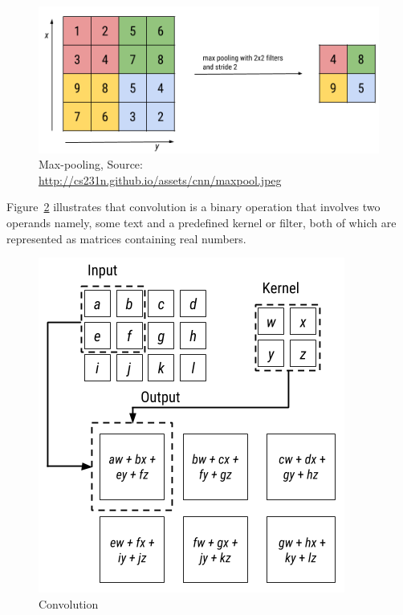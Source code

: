 \begin{figure}[!htb]
    \centering
    \includegraphics[scale=0.65]{Figures/max-pooling.png}
    \caption{Max-pooling, Source: \url{http://cs231n.github.io/assets/cnn/maxpool.jpeg}}
    \label{fig:maxpool}
\end{figure}
Figure~\ref{fig:convolution} illustrates that convolution is a binary operation that involves two operands namely, some text and a predefined kernel or filter, both of which are represented as matrices containing real numbers.
\begin{figure}[!htb]
    \centering
    \includegraphics[scale=0.5]{Figures/convolution.png}
    \caption{Convolution}
    \label{fig:convolution}
\end{figure}
